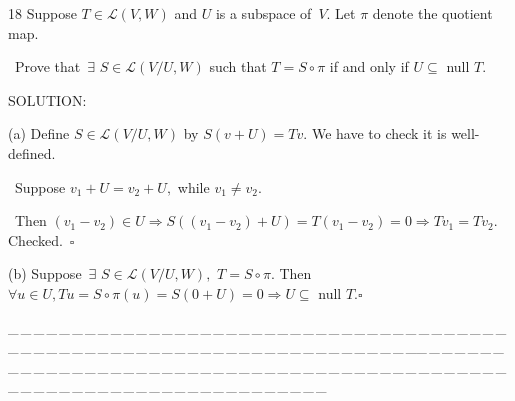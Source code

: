 \documentclass[a4paper, 11pt, UTF8]{article}
\def\Lm{\mathcal{L}}
\begin{document}
\begin{large}
{\timesbf\Large 18} {\timessl\Large 
Suppose $T\in\Lm(V,W)$ and $U$ is a subspace of \,$V$. Let $\pi$ denote the quotient map.}\par\quad\,
{\timessl\Large Prove that $\,\exists\,\,S\in\Lm(V/U,W)$ such that
$T=S\circ\pi$ if and only if $U\subseteq$ null $T$.
}\par
{\timesbf S\footnotesize{OLUTION:}}\par\quad
(a) Define $S\in\Lm(V/U,W)$ by $S(v+U)=Tv$. We have to check it is {\timessl well-defined}.\par\qquad\,
Suppose $v_1+U=v_2+U,$ while $v_1\neq v_2.$\par\qquad\,
Then $(v_1-v_2)\in U\Rightarrow S((v_1-v_2)+U)=T(v_1-v_2)=0\Rightarrow Tv_1=Tv_2.$ Checked.$\,\,\,\square$\par\quad
(b) Suppose $\,\exists\,\,S\in\Lm(V/U,W),\,\,T=S\circ\pi$. Then $\forall u\in U,Tu=S\circ\pi(u)=S(0+U)=0\Rightarrow U\subseteq$ null $T.\square$\par
{\tiny \_\,\_\,\_\,\_\,\_\,\_\,\_\,\_\,\_\,\_\,\_\,\_\,\_\,\_\,\_\,\_\,\_\,\_\,\_\,\_\,\_\,\_\,\_\,\_\,\_\,\_\,\_\,\_\,\_\,\_\,\_\,\_\,\_\,\_\,\_\,\_\,\_\,\_\,\_\,\_\,\_\,\_\,\_\,\_\,\_\,\_\,\_\,\_\,\_\,\_\,\_\,\_\,\_\,\_\,\_\,\_\,\_\,\_\,\_\,\_\,\_\,\_\,\_\,\_\,\_\,\_\,\_\,\_\,\_\,\_\,\_\_\,\_\,\_\,\_\,\_\,\_\,\_\,\_\,\_\,\_\,\_\,\_\,\_\,\_\,\_\,\_\,\_\,\_\,\_\,\_\,\_\,\_\,\_\,\_\,\_\,\_\,\_\,\_\,\_\,\_\,\_\,\_\,\_\,\_\,\_\,\_\,\_\,\_\,\_\,\_\,\_\,\_\,\_\,\_\,\_\,\_\,\_\,\_\,\_\,\_\,\_\,\_\,\_\,\_\,\_\,\_\,\_\,\_\,\_\,\_\,\_\,\_\,\_\,\_\,\_\,\_\,\_\,\_\,\_\,\_\,\_}\par


\end{large}
\end{document}
